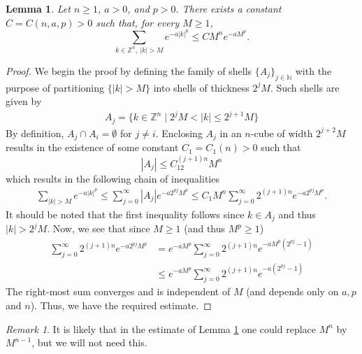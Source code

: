\documentclass[a4paper, 11pt, twoside, notitlepage]{amsart}
\newtheorem{lemma}[theorem]{Lemma}
\theoremstyle{definition}
\theoremstyle{remark}
\newtheorem{remark}{Remark}[section]
\begin{document}
\begin{lemma}\label{annulus_decomposition}
Let $n\geq 1$, $a>0$, and $p> 0$. There exists a constant
$C=C(n,a,p)>0$ such that, for every $M\geq 1$, 
\[
\sum_{k\in \mathbb{Z}^n,\ |k|>M}
e^{-a|k|^p}
\leq C M^n e^{-aM^p}.
\]
\end{lemma}
\begin{proof}
    We begin the proof by defining the family of shells $\{A_j\}_{j\in \mathbb{N}}$ with the purpose of partitioning $\{|k|>M\}$ into shells of thickness $2^jM$. Such shells are given by 
\begin{align*}
    A_j = \{k\in \mathbb{Z}^n\mid 2^j M<|k|\leq 2^{j+1}M\}
\end{align*}
By definition, $A_j\cap A_i=\emptyset$ for $j\neq i$. Enclosing $A_j$ in an $n$-cube of width $2^{j+2}M$ results in the existence of some constant $C_1=C_1(n)>0$ such that 
\[
    |A_j|\leq C_12^{(j+1)n}M^n
\]
which results in the following chain of inequalities
\begin{align*}
        \sum_{|k|>M} e^{-a|k|^p}\leq \sum_{j=0}^\infty |A_j|e^{-a2^{pj}M^p}\leq C_1M^n\sum_{j=0}^\infty 2^{(j+1)n}e^{-a2^{pj}M^p}.
\end{align*}
It should be noted that the first inequality follows since $k\in A_j$ and thus $|k|>2^jM$. Now, we see that since $M\geq 1$ (and thus $M^p\geq 1$)
\begin{align*}
    \sum_{j=0}^\infty 2^{(j+1)n}e^{-a2^{pj}M^p} 
    &=e^{-aM^p}\sum_{j=0}^\infty2^{(j+1)n}e^{-aM^p(2^{pj}-1)}\\ &\leq e^{-aM^p}\sum_{j=0}^\infty2^{(j+1)n}e^{-a(2^{pj}-1)}
\end{align*}
The right-most sum converges and is independent of $M$ (and depends only on $a,p$ and $n$). Thus, we have the required estimate.
\end{proof}

\begin{remark}
It is likely that in the estimate of Lemma \ref{annulus_decomposition} one could replace $M^n$ by $M^{n-1}$, but we will not need this.
\end{remark}
\end{document}
